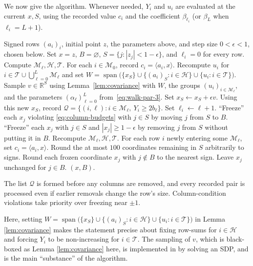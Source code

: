 \documentclass[reqno]{amsart}
\theoremstyle{definition}
\newcommand{\R}{\mathbb R}
\newcommand{\ip}[2]{\langle#1,#2\rangle}
\begin{document}
We now give the algorithm. Whenever needed, $Y_i$ and $u_i$ are evaluated at the current $x,S$, using the recorded value $c_i$ and the coefficient $\beta_{\ell_i}$ (or $\beta_L$ when $\ell_i=L+1$).

\begin{algorithm}[H]
\caption{Partial rounding}\label{alg:partial}
\begin{algorithmic}[1]
\Require Signed rows $(a_i)_i$, initial point $z$, the parameters above, and step size $0<\epsilon<1$, chosen below.
\State Set $x=z$, $B=\varnothing$, $S=\{j:|z_j|<1-\epsilon\}$, and $\ell_i=0$ for every row.
\State Compute $\mathcal M_\ell,\mathcal H,\mathcal T$. For each $i\in\mathcal M_0$, record $c_i=\ip{a_i}{x}$.
\State Recompute $u_i$ for $i\in\mathcal T\cup\bigcup_{\ell=0}^L\mathcal M_\ell$ and set $W=\operatorname{span}\bigl(\{x_S\}\cup \{(a_i)_S:i\in\mathcal H\}\cup\{u_i:i\in\mathcal T\}\bigr)$.
\State Sample $v\in\R^S$ using Lemma~\ref{lem:covariance} with $W$, the groups $(u_i)_{i\in\mathcal M_\ell}$, and the parameters $(\alpha_\ell)_{\ell=0}^L$ from~\eqref{eq:walk-par-3}.
\State Set $x_S\gets x_S+\epsilon v$.
\State Using this new $x_S$, record $\mathcal Q=\{(i,\ell):i\in\mathcal M_\ell,\ Y_i\ge2b_\ell\}$.
\State Set $\ell_i\gets\ell+1$.
\State ``Freeze'' each $x_j$ violating \eqref{eq:column-budgets} with $j\in S$ by moving $j$ from $S$ to $B$.
\EndFor
\State ``Freeze'' each $x_j$ with $j\in S$ and $|x_j|\ge1-\epsilon$ by removing $j$ from $S$ without putting it in $B$.
\State Recompute $\mathcal M_\ell,\mathcal H,\mathcal T$. For each row $i$ newly entering some $\mathcal M_\ell$, set $c_i=\ip{a_i}{x}$.
\EndWhile
\State Round the at most $100$ coordinates remaining in $S$ arbitrarily to signs.
\State Round each frozen coordinate $x_j$ with $j \not\in B$ to the nearest sign. Leave $x_j$ unchanged for $j\in B$.
\State \Return $(x,B)$.
\end{algorithmic}
\end{algorithm}

The list $\mathcal Q$ is formed before any columns are removed, and every recorded pair is processed even if earlier removals change the row's size. Column-condition violations take priority over freezing near $\pm1$.

Here, setting $W=\operatorname{span}\bigl(\{x_S\}\cup \{(a_i)_S:i\in\mathcal H\}\cup\{u_i:i\in\mathcal T\}\bigr)$ in Lemma \ref{lem:covariance} makes the statement precise about fixing row-sums for $i \in \mathcal{H}$ and forcing $Y_i$ to be non-increasing for $i \in \mathcal{T}$. The sampling of $v$, which is black-boxed as Lemma \ref{lem:covariance} here, is implemented in \cite{BJ} by solving an SDP, and is the main ``substance'' of the algorithm.
\end{document}
